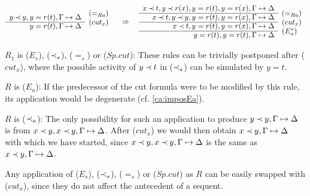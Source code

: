 \begin{PROOF}
\begin{LS}
\begin{LSA}
{\[\begin{array}{rl}
 y \Incl y,  y=r(t), \GSD  & \rabove{(=_{Ra})} \\ \cline{1-1}
  y=r(t), \GSD  & \rabove{(cut_x)} \end{array} \conv
  \begin{array}{rl}
x\Incl t,  y \Incl r(x),  y=r(t), y=r(x), \GSD \\ \cline{1-1}
x\Incl t,  y \Incl y,  y=r(t), y=r(x), \GSD  & \rabove{(=_{Ra})} \\ \cline{1-1}
 x \Incl t,  y=r(t), y=r(x), \GSD  & \rabove{(cut_x)} \\ \cline{1-1}
  y=r(t), y=r(t), \GSD  & \rabove{(E_a^*)} \end{array} \] }
\item $R_1$ is ($E_s$), ($\mathbin{\prec}_s$), ($=_s$) or ($Sp.cut$):
These rules can be trivially postponed after ($cut_x$), where the possible
activity of $y\mathbin{\prec} t$ in ($\mathbin{\prec}_s$) can be simulated by $y=t$.
\end{LSA}
%
\item $R$ is ($E_a$): If the predecessor of the cut formula were to be
modified by this rule, its application would be degenerate (cf. \ref{ca:imposEa}).
%
\item $R$ is ($\mathbin{\prec}_a$): The only possibility for such an application to
produce $y\mathbin{\prec} y,\Gamma\mathrel{\mapsto}\Delta$ is from $x\mathbin{\prec} y, x\mathbin{\prec} y,\Gamma\mathrel{\mapsto}\Delta$.
After ($cut_x$) we would then obtain $x\mathbin{\prec} y,\Gamma\mathrel{\mapsto}\Delta$ with which we have started,
since $x\mathbin{\prec} y, x\mathbin{\prec} y,\Gamma\mathrel{\mapsto}\Delta$ is the same as $x\mathbin{\prec} y,\Gamma\mathrel{\mapsto}\Delta$.
%
\item Any application of ($E_s$), ($\mathbin{\prec}_s$), ($=_s$) or ($Sp.cut$) as $R$
can be easily swapped with ($cut_x$), since they do not affect the antecedent of a sequent.
\end{LS}
\end{PROOF}
%

